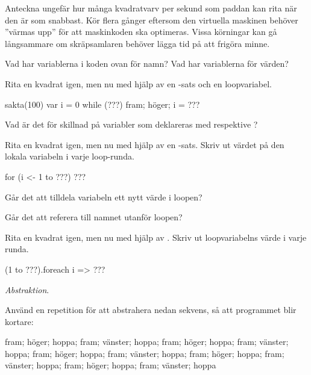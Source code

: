 \Subtask\Pen Anteckna ungefär hur många kvadratvarv per sekund som paddan kan rita när den är som snabbast. Kör flera gånger eftersom den virtuella maskinen behöver ''värmas upp'' för att maskinkoden ska optimeras. Vissa körningar kan gå långsammare om skräpsamlaren behöver lägga tid på att frigöra minne.

\Subtask\Pen Vad har variablerna i koden ovan för namn? Vad har variablerna för värden?

\Subtask Rita en kvadrat igen, men nu med hjälp av en -sats och en loopvariabel. %

\begin{Code}
sakta(100)
var i = 0
while (???) { fram; höger; i = ??? }
\end{Code}

\Subtask\Pen Vad är det för skillnad på variabler som deklareras med  respektive ?

\Subtask Rita en kvadrat igen, men nu med hjälp av en -sats. Skriv ut värdet på den lokala variabeln  i varje loop-runda.

\begin{Code}
for (i <- 1 to ???) { ??? }
\end{Code}

\Subtask\Pen Går det att tilldela variabeln  ett nytt värde i loopen?

\Subtask\Pen Går det att referera till namnet  utanför loopen?


\Subtask Rita en kvadrat igen, men nu med hjälp av . Skriv ut loopvariabelns värde i varje runda.

\begin{Code}
(1 to ???).foreach{ i => ??? }
\end{Code}



\Task \textit{Abstraktion}.

\Subtask Använd en repetition för att abstrahera nedan sekvens, så att programmet blir kortare:
\begin{Code}
fram; höger; hoppa; fram; vänster; hoppa; fram; höger;
hoppa; fram; vänster; hoppa; fram; höger; hoppa; fram;
vänster; hoppa; fram; höger; hoppa; fram; vänster; hoppa;
fram; höger; hoppa; fram; vänster; hoppa
\end{Code}

